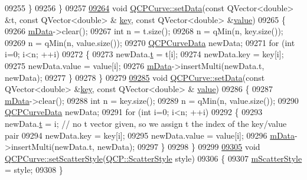 \begin{DoxyCode}
09255   \}
09256 \}
09257 
\hypertarget{a00115_source_l09264}{}\hyperlink{a00028_affe80e011e2ced62a88f614acd6ab8d1}{09264} \textcolor{keywordtype}{void} \hyperlink{a00028_a631ac886708460013b30052f49cbc9da}{QCPCurve::setData}(\textcolor{keyword}{const} QVector<double> &t, \textcolor{keyword}{const} QVector<double> &
      \hyperlink{a00116_a94bb892c30911cd62cba0707a5395be4}{key}, \textcolor{keyword}{const} QVector<double> &\hyperlink{a00116_aee90379adb0307effb138f4871edbc5c}{value})
09265 \{
09266   \hyperlink{a00028_a88d533e455bca96004b049e99168731b}{mData}->clear();
09267   \textcolor{keywordtype}{int} n = t.size();
09268   n = qMin(n, key.size());
09269   n = qMin(n, value.size());
09270   \hyperlink{a00029}{QCPCurveData} newData;
09271   \textcolor{keywordflow}{for} (\textcolor{keywordtype}{int} i=0; i<n; ++i)
09272   \{
09273     newData.\hyperlink{a00029_aecc395525be28e9178a088793beb3ff3}{t} = t[i];
09274     newData.key = key[i];
09275     newData.value = value[i];
09276     \hyperlink{a00028_a88d533e455bca96004b049e99168731b}{mData}->insertMulti(newData.t, newData);
09277   \}
09278 \}
09279 
\hypertarget{a00115_source_l09285}{}\hyperlink{a00028_a963d4c45777deef15848a8f56172d066}{09285} \textcolor{keywordtype}{void} \hyperlink{a00028_a631ac886708460013b30052f49cbc9da}{QCPCurve::setData}(\textcolor{keyword}{const} QVector<double> &\hyperlink{a00116_a94bb892c30911cd62cba0707a5395be4}{key}, \textcolor{keyword}{const} QVector<double> &
      \hyperlink{a00116_aee90379adb0307effb138f4871edbc5c}{value})
09286 \{
09287   \hyperlink{a00028_a88d533e455bca96004b049e99168731b}{mData}->clear();
09288   \textcolor{keywordtype}{int} n = key.size();
09289   n = qMin(n, value.size());
09290   \hyperlink{a00029}{QCPCurveData} newData;
09291   \textcolor{keywordflow}{for} (\textcolor{keywordtype}{int} i=0; i<n; ++i)
09292   \{
09293     newData.\hyperlink{a00029_aecc395525be28e9178a088793beb3ff3}{t} = i; \textcolor{comment}{// no t vector given, so we assign t the index of the key/value pair}
09294     newData.key = key[i];
09295     newData.value = value[i];
09296     \hyperlink{a00028_a88d533e455bca96004b049e99168731b}{mData}->insertMulti(newData.t, newData);
09297   \}
09298 \}
09299 
\hypertarget{a00115_source_l09305}{}\hyperlink{a00028_a478a6f67c135f354c0401ba01fc088a0}{09305} \textcolor{keywordtype}{void} \hyperlink{a00028_a478a6f67c135f354c0401ba01fc088a0}{QCPCurve::setScatterStyle}(\hyperlink{a00143_af66d0711d42fe78d96c28abadc67f26f}{QCP::ScatterStyle} style)
09306 \{
09307   \hyperlink{a00028_a5700a112cb679dc983648f67151d5cae}{mScatterStyle} = style;
09308 \}

\end{DoxyCode}
